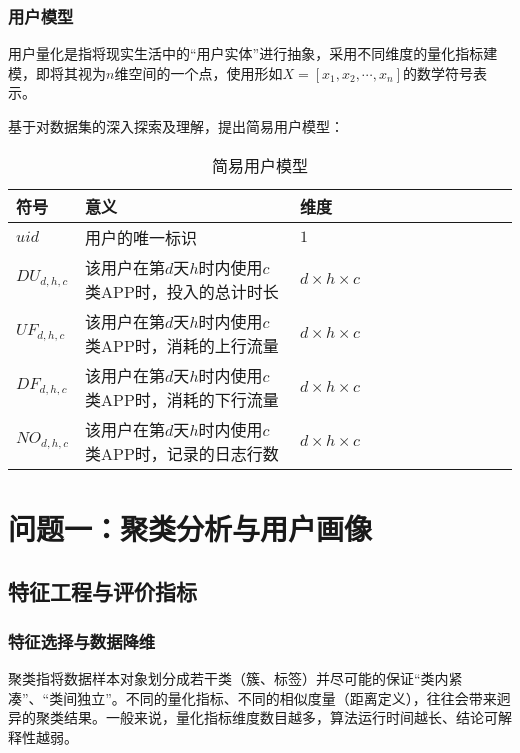 \documentclass[withoutpreface,bwprint]{cumcmthesis}
\begin{document}
\subsubsection{用户模型}

用户量化是指将现实生活中的“用户实体”进行抽象，采用不同维度的量化指标建模，即将其视为$n$维空间的一个点，使用形如$X=[x_1, x_2, \cdots , x_n]$的数学符号表示。

基于对数据集的深入探索及理解，提出简易用户模型：

\begin{table}[!htbp]
    \caption{简易用户模型}\label{tab:006} \centering
    \begin{tabular}{lllllrlrlrrr}
        \toprule[1.5pt]
        符号             & 意义                               & 维度                   \\
        \midrule[1pt]
        $uid$          & 用户的唯一标识                          & $1$                  \\
        $DU_{d, h, c}$ & 该用户在第$d$天$h$时内使用$c$类APP时，投入的总计时长 & $d\times h \times c$ \\
        $UF_{d, h, c}$ & 该用户在第$d$天$h$时内使用$c$类APP时，消耗的上行流量 & $d\times h \times c$ \\
        $DF_{d, h, c}$ & 该用户在第$d$天$h$时内使用$c$类APP时，消耗的下行流量 & $d\times h \times c$ \\
        $NO_{d, h, c}$ & 该用户在第$d$天$h$时内使用$c$类APP时，记录的日志行数 & $d\times h \times c$ \\
        \bottomrule[1.5pt]
    \end{tabular}
\end{table}

\section{问题一：聚类分析与用户画像}

\subsection{特征工程与评价指标}

\subsubsection{特征选择与数据降维}

聚类指将数据样本对象划分成若干类（簇、标签）并尽可能的保证“类内紧凑”、“类间独立”\cite{数据仓库与数据挖掘}。不同的量化指标、不同的相似度量（距离定义），往往会带来迥异的聚类结果。一般来说，量化指标维度数目越多，算法运行时间越长、结论可解释性越弱。
\end{document}
